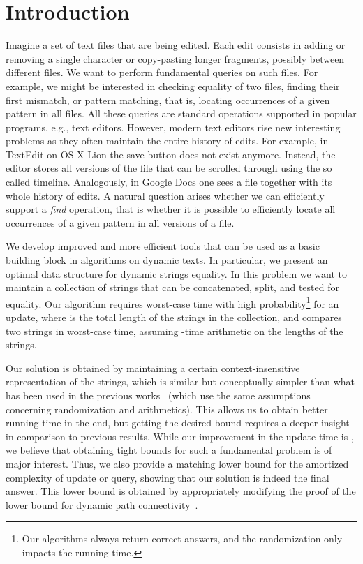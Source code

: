 \documentclass[a4paper]{article}
\theoremstyle{remark}
\begin{document}
\tableofcontents
\newpage

\section{Introduction}
Imagine a set of text files that are being edited. Each edit consists in adding or removing a single character or copy-pasting longer
fragments, possibly between different files. We want to perform fundamental queries on such
files. For example, we might be interested in checking equality of two files, finding their
first mismatch, or pattern matching, that is, locating occurrences of a given pattern in all files.
All these queries are standard operations supported in popular programs, e.g., text editors. However, modern
text editors rise new interesting problems as they often maintain the entire history of edits.
For example, in TextEdit on OS X Lion the save button does not exist anymore.
Instead, the editor stores all versions of the file that can be scrolled through using the so called timeline.
Analogously, in Google Docs one sees a file together with its whole history of edits.
A natural question arises whether we can efficiently support a \emph{find} operation,
that is whether it is possible to efficiently locate all occurrences of a given pattern in all versions of a file.

We develop improved and more efficient tools that can be used as a basic building block in algorithms on dynamic texts.
In particular, we present an optimal data structure for dynamic strings equality.
In this problem we want to maintain a collection of strings that can be concatenated, split, and tested for equality. Our algorithm
requires  worst-case time with high probability\footnote{Our algorithms always return correct answers, and the
randomization only impacts the running time.} for an update, where  is the total length of the strings in the collection,
and compares two strings in  worst-case time, assuming -time arithmetic on
the lengths of the strings.

Our solution is obtained by maintaining a certain context-insensitive representation of the strings,
which is similar but conceptually simpler than what has been used in the previous works~\cite{Alstrup,Mehlhorn}
(which use the same assumptions concerning randomization and arithmetics).
This allows us to obtain better running time in the end, but getting the desired bound requires a deeper insight in comparison to previous results.
While our improvement in the update time is , we
believe that obtaining tight bounds for such a fundamental problem is of major interest.
Thus, we also provide a matching  lower bound for the amortized complexity
of update or query, showing that our solution is indeed the final answer. This lower bound is obtained
by appropriately modifying the proof of the lower bound for dynamic path connectivity~\cite{logarithmic}.
\end{document}
